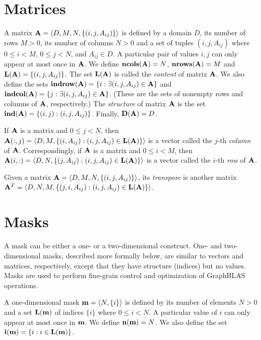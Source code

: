 \section{Matrices}
\label{Sec:Matrices}

A matrix ${\bf A} = \langle D, M, N, \{ (i,j,A_{ij}) \} \rangle$ is
defined by a domain $D$, its number of rows $M>0$, its number of columns
$N>0$ and a set of tuples $(i,j,A_{ij})$ where $0 \leq i < M$, $0 \leq
j < N$, and $A_{ij} \in D$. A particular pair of values $i,j$ can only
appear at most once in ${\bf A}$. We define $\bold{ncols}({\bf A})
= N$,  $\bold{nrows}({\bf A}) = M$ and $\bold{L}({\bf A})
= \{ (i,j,A_{ij}) \}$.  The set $\bold{L}({\bf A})$ is called
the \emph{content} of matrix ${\bf A}$.  We also define the sets
${\bf indrow({\bf A})} = \{ i : \exists (i,j,A_{ij}) \in {\bf A}
\}$ and ${\bf indcol({\bf A})} = \{ j : \exists (i,j,A_{ij}) \in
{\bf A} \}$.  (These are the sets of nonempty rows and columns of
${\bf A}$, respectively.)  The \emph{structure} of matrix ${\bf A}$
is the set $\bold{ind}({\bf A}) = \{ (i,j) : (i,j,A_{ij}) \}$.
Finally, $\bold{D}({\bf A}) = D$.

If ${\bf A}$ is a matrix and $0 \leq j < N$, then ${\bf A}(:,j)
= \langle D, M, \{(i,A_{ij}) : (i,j,A_{ij}) \in \bold{L}({\bf A})
\} \rangle$ is a vector called the $j$-th \emph{column}
of ${\bf A}$. Correspondingly, if ${\bf A}$ is a matrix and
$0 \leq i < M$, then ${\bf A}(i,:) = \langle D, N, \{(j,A_{ij}) :
(i,j,A_{ij}) \in \bold{L}({\bf A}) \} \rangle$ is a vector called
the $i$-th \emph{row} of ${\bf A}$.

Given a matrix ${\bf A} = \langle D, M, N, \{ (i,j,A_{ij}) \} \rangle$,
its \emph{transpose} is another matrix ${\bf A}^T = \langle D, N, M, \{
(j,i,A_{ij}) : (i,j,A_{ij}) \in \bold{L}({\bf A}) \} \rangle$.

\section{Masks}
\label{Sec:Masks}

A mask can be either a one- or a two-dimensional construct.
One- and two-dimensional masks, described more formally below, are
similar to vectors and matrices, respectively, except that they have
structure (indices) but no values. Masks are used to perform fine-grain control and optimization of GraphBLAS operations.

A one-dimensional mask ${\bf m} = \langle N, \{ i \} \rangle$
is defined by its number of elements $N>0$ and a set $\bold{L}({\bf m})$ of indices $\{ i \}$ 
where $0 \leq i < N$.  A particular value of $i$ can only
appear at most once in ${\bf m}$. We define $\bold{n}({\bf m}) = N$. 
We also define the set
${\bf i({\bf m})} = \{ i : i \in \bold{L}({\bf m}) \}$.

